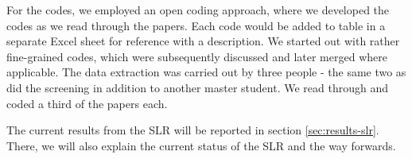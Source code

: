 For the codes, we employed an open coding approach, where we developed the codes as we read through the papers. Each code would be added to table in a separate Excel sheet for reference with a description. We started out with rather fine-grained codes, which were subsequently discussed and later merged where applicable. The data extraction was carried out by three people - the same two as did the screening in addition to another master student. We read through and coded a third of the papers each.

The current results from the SLR will be reported in section \ref{sec:results-slr}. There, we will also explain the current status of the SLR and the way forwards.